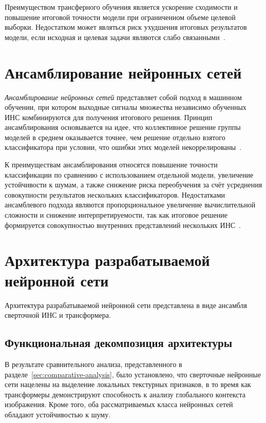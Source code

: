 Преимуществом трансферного обучения является ускорение сходимости и повышение итоговой точности модели при ограниченном объеме целевой выборки. Недостатком может являться риск ухудшения итоговых результатов модели, если исходная и целевая задачи являются слабо связанными~\cite{transfer-learning}.

\section{Ансамблирование нейронных сетей}

\textit{Ансамблирование нейронных сетей} представляет собой подход в машинном обучении, при котором выходные сигналы множества независимо обученных ИНС комбинируются для получения итогового решения. Принцип ансамблирования основывается на идее, что коллективное решение группы моделей в среднем оказывается точнее, чем решение отдельно взятого классификатора при условии, что ошибки этих моделей некоррелированы~\cite{ensembles}.

К преимуществам ансамблирования относятся повышение точности классификации по сравнению с использованием отдельной модели, увеличение устойчивости к шумам, а также снижение риска переобучения за счёт усреднения совокупности результатов нескольких классификаторов. Недостатками ансамблевого подхода являются пропорциональное увеличение вычислительной сложности и снижение интерпретируемости, так как итоговое решение формируется совокупностью внутренних представлений нескольких ИНС~\cite{ensembles}.

\section{Архитектура разрабатываемой нейронной сети}

Архитектура разрабатываемой нейронной сети представлена в виде ансамбля сверточной ИНС и трансформера.

\subsection{Функциональная декомпозиция архитектуры}

В результате сравнительного анализа, представленного в разделе~\ref{sec:comparative-analysis}, было установлено, что сверточные нейронные сети нацелены на выделение локальных текстурных признаков, в то время как трансформеры демонстрируют способность к анализу глобального контекста изображения. Кроме того, оба рассматриваемых класса нейронных сетей обладают устойчивостью к шуму. 

